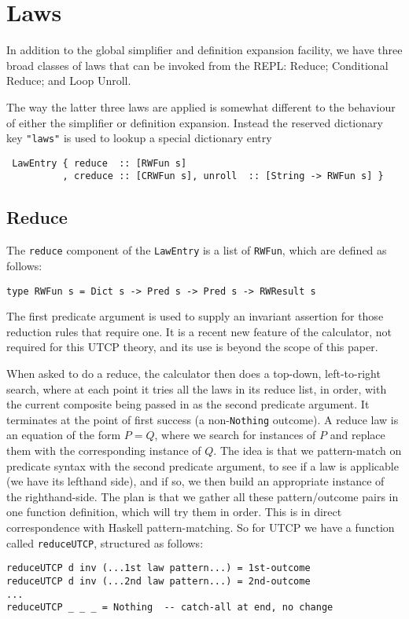 \section{Laws}\label{sec:Laws}

In addition to the global simplifier and definition expansion facility,
we have three broad classes of laws that can be invoked from the REPL:
Reduce; Conditional Reduce; and Loop Unroll.

The way the latter three laws are applied is somewhat different
to the behaviour of either the simplifier or definition expansion.
Instead the reserved dictionary key \verb$"laws"$ is used
to lookup a special dictionary entry
\begin{verbatim}
 LawEntry { reduce  :: [RWFun s]
          , creduce :: [CRWFun s], unroll  :: [String -> RWFun s] }
\end{verbatim}

\subsection{Reduce}

The \texttt{reduce} component of the \texttt{LawEntry} is a list of \texttt{RWFun},
which are defined as follows:
\begin{verbatim}
type RWFun s = Dict s -> Pred s -> Pred s -> RWResult s
\end{verbatim}
The first predicate argument is used to supply an invariant
assertion for those reduction rules that require one.
It is a recent new feature of the calculator,
not required for this UTCP theory,
and its use is beyond the scope of this paper.

When asked to do a reduce,
the calculator then does a top-down, left-to-right search,
where at each point it tries all the laws in its reduce list, in order,
with the current composite being passed in as the second predicate
argument.
It terminates at the point of first success (a non-\texttt{Nothing} outcome).
A reduce law is an equation of the form $P = Q$,
where we search for instances of $P$ and replace them with the
corresponding instance of $Q$.
The idea is that we pattern-match on predicate syntax
with the second predicate argument,
to see if a law is applicable (we have its lefthand side),
and if so,
we then build an appropriate instance of the righthand-side.
The plan is that we gather all these pattern/outcome pairs
in one function definition,
which will try them in order.
This is in direct correspondence with Haskell pattern-matching.
So for UTCP we have a function called \texttt{reduceUTCP},
structured as follows:
\begin{verbatim}
reduceUTCP d inv (...1st law pattern...) = 1st-outcome
reduceUTCP d inv (...2nd law pattern...) = 2nd-outcome
...
reduceUTCP _ _ _ = Nothing  -- catch-all at end, no change
\end{verbatim}

